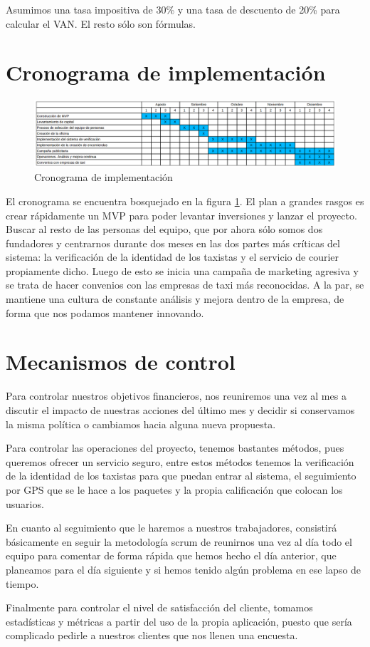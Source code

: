 Asumimos una tasa impositiva de 30\% y una tasa de descuento de 20\% para calcular el VAN. El resto sólo son fórmulas.

\section{Cronograma de implementación}

\begin{figure}[htb]
\centering
\includegraphics[width=1\textwidth]{./img/cronograma}
\caption{Cronograma de implementación} \label{fig:cronograma}
\end{figure}

El cronograma se encuentra bosquejado en la figura \ref{fig:cronograma}. El plan a grandes rasgos es crear rápidamente un MVP para poder levantar inversiones y lanzar el proyecto. Buscar al resto de las personas del equipo, que por ahora sólo somos dos fundadores y centrarnos durante dos meses en las dos partes más críticas del sistema: la verificación de la identidad de los taxistas y el servicio de courier propiamente dicho. Luego de esto se inicia una campaña de marketing agresiva y se trata de hacer convenios con las empresas de taxi más reconocidas. A la par, se mantiene una cultura de constante análisis y mejora dentro de la empresa, de forma que nos podamos mantener innovando.


\section{Mecanismos de control}

Para controlar nuestros objetivos financieros, nos reuniremos una vez al mes a discutir el impacto de nuestras acciones del último mes y decidir si conservamos la misma política o cambiamos hacia alguna nueva propuesta.

Para controlar las operaciones del proyecto, tenemos bastantes métodos, pues queremos ofrecer un servicio seguro, entre estos métodos tenemos la verificación de la identidad de los taxistas para que puedan entrar al sistema, el seguimiento por GPS que se le hace a los paquetes y la propia calificación que colocan los usuarios.

En cuanto al seguimiento que le haremos a nuestros trabajadores, consistirá básicamente en seguir la metodología scrum de reunirnos una vez al día todo el equipo para comentar de forma rápida que hemos hecho el día anterior, que planeamos para el día siguiente y si hemos tenido algún problema en ese lapso de tiempo.

Finalmente para controlar el nivel de satisfacción del cliente, tomamos estadísticas y métricas a partir del uso de la propia aplicación, puesto que sería complicado pedirle a nuestros clientes que nos llenen una encuesta.